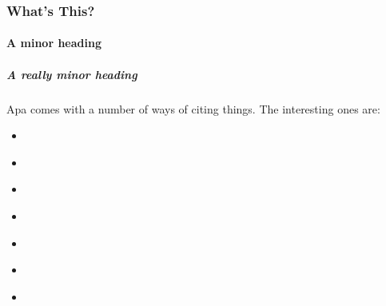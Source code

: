 \documentclass{dragonfly-report}
\begin{document}
\subsubsection{What's This?}
\lipsum[3] 
\paragraph{A minor heading}
\lipsum[5] 
\subparagraph{A really minor heading}
\lipsum[4]

Apa comes with a number of ways of citing things.
The interesting ones are:


\begin{itemize}
  \item \cite{abraham_summary_98-09}
  \item \citet{baker_nzclassification_2010}
  \item \citep{brandao_estimates_2010}
  \item \parencite{ _birdlife_2009}
  \item {}
  \item \citeyear{acap_summary_2011b}
  \item \textcite{acap_summary_2011b}
\end{itemize}


\clearpage
\printbibliography
\end{document}
